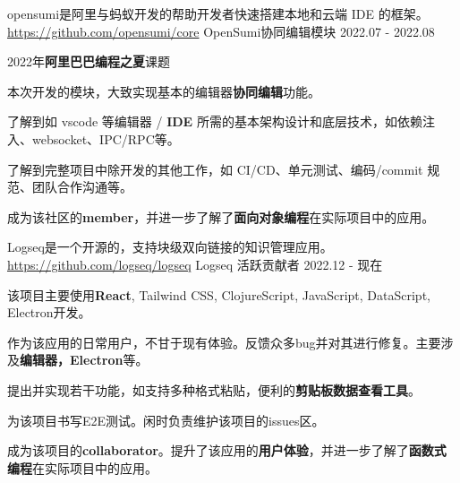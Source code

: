 

\begin{cventries}


    \cventry
    {opensumi是阿里与蚂蚁开发的帮助开发者快速搭建本地和云端 IDE 的框架。\href{https://github.com/opensumi/core}{https://github.com/opensumi/core}} %
    {OpenSumi协同编辑模块} %
    {} %
    {2022.07 - 2022.08} %
    {
        \begin{cvitems} %
            \item {2022年\textbf{阿里巴巴编程之夏}课题}
            \item {本次开发的模块，大致实现基本的编辑器\textbf{协同编辑}功能。}
            \item {了解到如 vscode 等编辑器 / \textbf{IDE} 所需的基本架构设计和底层技术，如依赖注入、websocket、IPC/RPC等。}
            \item {了解到完整项目中除开发的其他工作，如 CI/CD、单元测试、编码/commit 规范、团队合作沟通等。}
            \item {成为该社区的\textbf{member}，并进一步了解了\textbf{面向对象编程}在实际项目中的应用。}
        \end{cvitems}
    }


    \cventry
    {Logseq是一个开源的，支持块级双向链接的知识管理应用。\href{https://github.com/logseq/logseq}{https://github.com/logseq/logseq}} %
    {Logseq 活跃贡献者} %
    {} %
    {2022.12 - 现在} %
    {
        \begin{cvitems} %
            \item {该项目主要使用\textbf{React}, Tailwind CSS, ClojureScript, JavaScript, DataScript, Electron开发。}
            \item {作为该应用的日常用户，不甘于现有体验。反馈众多bug并对其进行修复。主要涉及\textbf{编辑器，Electron}等。}
            \item {提出并实现若干功能，如支持多种格式粘贴，便利的\textbf{剪贴板数据查看工具}。}
            \item {为该项目书写E2E测试。闲时负责维护该项目的issues区。}
            \item {成为该项目的\textbf{collaborator}。提升了该应用的\textbf{用户体验}，并进一步了解了\textbf{函数式编程}在实际项目中的应用。}
        \end{cvitems}
    }

\end{cventries}
